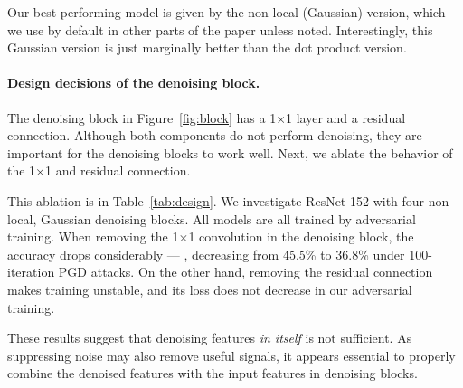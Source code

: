 \documentclass[10pt,twocolumn,letterpaper]{article}
\begin{document}
Our best-performing model is given by the non-local (Gaussian) version, which we use by default in other parts of the paper unless noted. Interestingly, this Gaussian version is just marginally better than the dot product version.



\renewcommand\arraystretch{1.02}
\setlength{\tabcolsep}{12pt}
\begin{table}[t]
\centering
{}
\vspace{.5em}
\caption{\textbf{Ablation: denoising block design} for defending against \emph{white-box} attacks on ImageNet. Our networks have four (Gaussian) non-local means denoising blocks. We indicate the performance of models we were unable to train by ``NaN''. 
}
\label{tab:design}
\vspace{-.5em}
\end{table}


\paragraph{Design decisions of the denoising block.} The denoising block in Figure~\ref{fig:block} has a 1$\times$1 layer and a residual connection. Although both components do not perform denoising, they are important for the denoising blocks to work well. Next, we ablate the behavior of the 1$\times$1 and residual connection.

This ablation is in Table~\ref{tab:design}.
We investigate ResNet-152 with four non-local, Gaussian denoising blocks.
All models are all trained by adversarial training.
When removing the 1$\times$1 convolution in the denoising block, the accuracy drops considerably --- \eg, decreasing from 45.5\% to 36.8\% under 100-iteration PGD attacks.
On the other hand, removing the residual connection makes training unstable, and its loss does not decrease in our adversarial training.

These results suggest that denoising features \emph{in itself} is not sufficient. As suppressing noise may also remove useful signals, it appears essential to properly combine the denoised features with the input features in denoising blocks.
\end{document}
